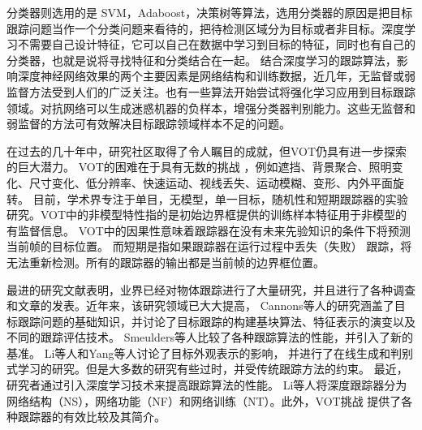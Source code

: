 \documentclass[promaster]{thesis-uestc}
\begin{document}
分类器则选用的是 SVM，Adaboost，决策树等算法，选用分类器的原因是把目标跟踪问题当作一个分类问题来看待的，把待检测区域分为目标或者非目标。深度学习不需要自己设计特征，它可以自己在数据中学习到目标的特征，同时也有自己的分类器，也就是说将寻找特征和分类结合在一起。
结合深度学习的跟踪算法，影响深度神经网络效果的两个主要因素是网络结构和训练数据，近几年，无监督或弱监督方法受到人们的广泛关注。也有一些算法开始尝试将强化学习应用到目标跟踪领域。对抗网络可以生成迷惑机器的负样本，增强分类器判别能力。这些无监督和弱监督的方法可有效解决目标跟踪领域样本不足的问题。

在过去的几十年中，研究社区取得了令人瞩目的成就，但VOT仍具有进一步探索的巨大潜力。 VOT的困难在于具有无数的挑战
，例如遮挡、背景聚合、照明变化、尺寸变化、低分辨率、快速运动、视线丢失、运动模糊、变形、内外平面旋转\cite{wu2013online}。
目前，学术界专注于单目，无模型，单一目标，随机性和短期跟踪器的实验研究。VOT中的非模型特性指的是初始边界框提供的训练样本特征用于非模型的有监督信息。
VOT中的因果性意味着跟踪器在没有未来先验知识的条件下将预测当前帧的目标位置。 而短期是指如果跟踪器在运行过程中丢失（失败）
跟踪，将无法重新检测。所有的跟踪器的输出都是当前帧的边界框位置。

最进的研究文献表明，业界已经对物体跟踪进行了大量研究，并且进行了各种调查和文章的发表。近年来，该研究领域已大大提高，
Cannons等人\cite{cannons2008review}的研究涵盖了目标跟踪问题的基础知识，并讨论了目标跟踪的构建基块算法、特征表示的演变以及不同的跟踪评估技术。
Smeulders等人\cite{smeulders2013visual}比较了各种跟踪算法的性能，并引入了新的基准。 Li等人\cite{li2013survey}和Yang等人\cite{yang2011recent}讨论了目标外观表示的影响，
并进行了在线生成和判别式学习的研究。但是大多数的研究有些过时，并受传统跟踪方法的约束。
最近，研究者通过引入深度学习技术来提高跟踪算法的性能。
Li等人\cite{li2011real}将深度跟踪器分为网络结构（NS），网络功能（NF）和网络训练（NT）。此外，VOT挑战\cite{kristan2019seventh}
提供了各种跟踪器的有效比较及其简介。
\end{document}
